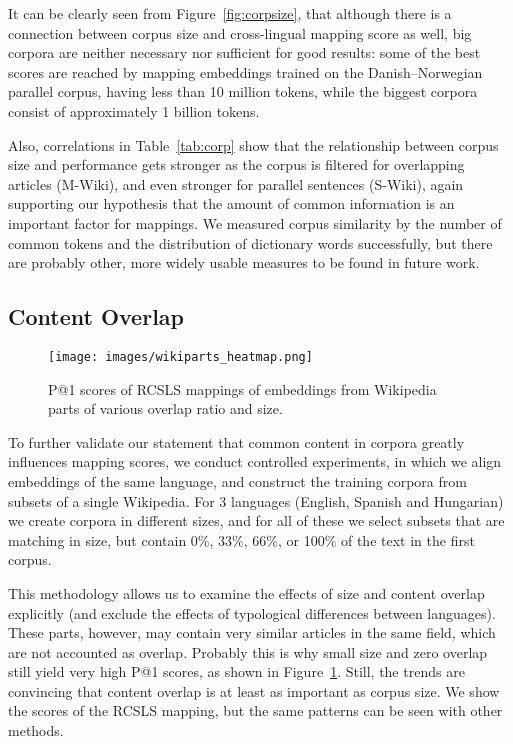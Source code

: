 \documentclass[11pt]{article}
\begin{document}
    It can be clearly seen from Figure~\ref{fig:corpsize}, that although there is a connection between corpus size and cross-lingual mapping score as well, big corpora are neither necessary nor sufficient for good results: some of the best scores are reached by mapping embeddings trained on the Danish--Norwegian parallel corpus, having less than 10 million tokens, while the biggest corpora consist of approximately 1 billion tokens.
     
    Also, correlations in Table~\ref{tab:corp} show that the relationship between corpus size and performance gets stronger as the corpus is filtered for overlapping articles (M-Wiki), and even stronger for parallel sentences (S-Wiki), again supporting our hypothesis that the amount of common information is an important factor for mappings. We measured corpus similarity by the number of common tokens and the distribution of dictionary words successfully, but there are probably other, more widely usable measures to be found in future work.
    
\subsection{Content Overlap}

    \begin{figure}[th]
        \centering
        \texttt{[image: images/wikiparts\_heatmap.png]}
        \caption{P@1 scores of RCSLS mappings of embeddings from Wikipedia parts of various overlap ratio and size.}
        \label{fig:parts_heatmap}
    \end{figure}
    
    To further validate our statement that common content in corpora greatly influences mapping scores, we conduct controlled experiments, in which we align embeddings of the same language, and construct the training corpora from subsets of a single Wikipedia.
    For 3 languages (English, Spanish and Hungarian) we create corpora in different sizes, and for all of these we select subsets that are matching in size, but contain 0\%, 33\%, 66\%, or 100\% of the text in the first corpus.
    
    This methodology allows us to examine the effects of size and content overlap explicitly (and exclude the effects of typological differences between languages). These parts, however, may contain very similar articles in the same field, which are not accounted as overlap. Probably this is why small size and zero overlap still yield very high P@1 scores, as shown in Figure~\ref{fig:parts_heatmap}. Still, the trends are convincing that content overlap is at least as important as corpus size. We show the scores of the RCSLS mapping, but the same patterns can be seen with other methods.
    
\end{document}
